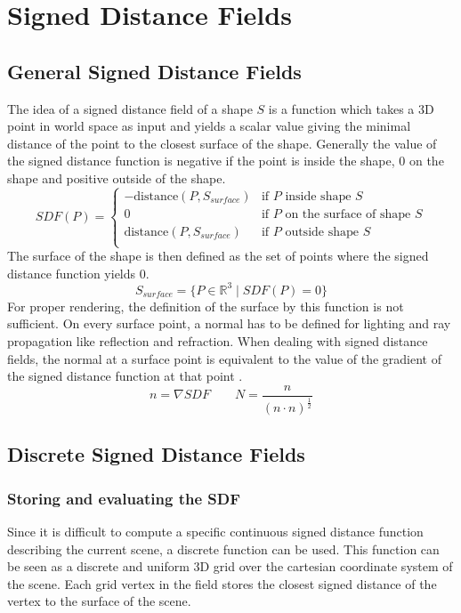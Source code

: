\documentclass[12pt]{article}
\newcommand{\halfpow}[1]{^\frac{#1}{2}}
\begin{document}
\section{Signed Distance Fields}
\subsection{General Signed Distance Fields}
The idea of a signed distance field of a shape $S$ is a function which takes a 3D point in world space as input and yields a scalar value giving the minimal distance of the point to the closest surface of the shape. Generally the value of the signed distance function is negative if the point is inside the shape, 0 on the shape and positive outside of the shape.
\begin{equation} \label{eq:sdfdef}
SDF(P) = 
\begin{cases} 
-\text{distance}(P, S_{surface})  & \mbox{if } \text{$P$ inside shape $S$} \\ 
0 & \mbox{if } \text{$P$ on the surface of shape $S$} \\
\text{distance}(P, S_{surface})  & \mbox{if } \text{$P$ outside shape $S$} \\ 
\end{cases}
\end{equation}
The surface of the shape is then defined as the set of points where the signed distance function yields 0.
\begin{equation}
S_{surface} = \{P \in \mathbb{R}^3 \mid SDF(P) = 0\}
\end{equation}
For proper rendering, the definition of the surface by this function is not sufficient. On every surface point, a normal has to be defined for lighting and ray propagation like reflection and refraction. When dealing with signed distance fields, the normal at a surface point is equivalent to the value of the gradient of the signed distance function at that point \cite{Osher:2003}.
\begin{equation} \label{eq:sdfnormal}
n = \nabla SDF \qquad N = \frac{n}{(n \cdot n) \halfpow{1}} 
\end{equation}

\subsection{Discrete Signed Distance Fields}
\subsubsection{Storing and evaluating the SDF}
Since it is difficult to compute a specific continuous signed distance function describing the current scene, a discrete function can be used. This function can be seen as a discrete and uniform 3D grid over the cartesian coordinate system of the scene. Each grid vertex in the field stores the closest signed distance of the vertex to the surface of the scene. 
\end{document}
